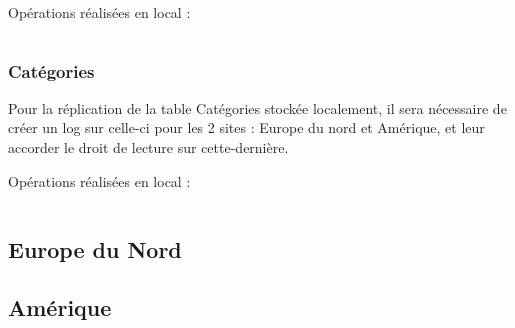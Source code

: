\documentclass[10pt,a4paper]{article}
\theoremstyle{plain}
\begin{document}
Opérations réalisées en local :
\inputminted{sql}{EUS_VI-1.sql}

\subsubsection{Catégories}
Pour la réplication de la table Catégories stockée localement, il sera nécessaire de créer un log sur celle-ci pour les 2 sites : Europe du nord et Amérique, et leur accorder le droit de lecture sur cette-dernière.

Opérations réalisées en local :
\inputminted{sql}{EUS_VI-2.sql}
\newpage

\subsection{Europe du Nord}
\newpage 

\subsection{Amérique}
\newpage
\end{document}
